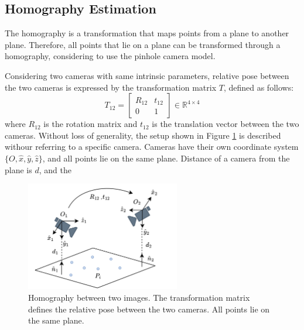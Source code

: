 \subsection{Homography Estimation}
The homography is a transformation that maps points from a plane to another 
plane. Therefore, all points that lie on a plane can be transformed through 
a homography, considering to use the pinhole camera model.

Considering two cameras with same intrinsic parameters, relative pose between 
the two cameras is expressed by the transformation matrix $T$, defined as follows:
\begin{equation*}
    T_{12} = \begin{bmatrix}
        R_{12} & t_{12} \\
        0 & 1
    \end{bmatrix}
    \in \mathbb{R}^{4 \times 4}
\end{equation*}
where $R_{12}$ is the rotation matrix and $t_{12}$ is the translation vector 
between the two cameras.
Without loss of generality, the setup shown in Figure \ref{fig:homography_scheme}
is described withour referring to a specific camera.
Cameras have their own coordinate system $\{O, \hat{x}, \hat{y}, \hat{z}\}$,
and all points lie on the same plane.
Distance of a camera from the plane is $d$, and the 
\begin{figure}
    \centering
    \includegraphics[width=0.6\textwidth]{images/dreyeve/homography.png}
    \vspace{0.2cm}
    \caption[Homography scheme.]
    {Homography between two images. The transformation matrix defines the 
    relative pose between the two cameras. All points lie on the same plane.}
    \label{fig:homography_scheme}
\end{figure}
